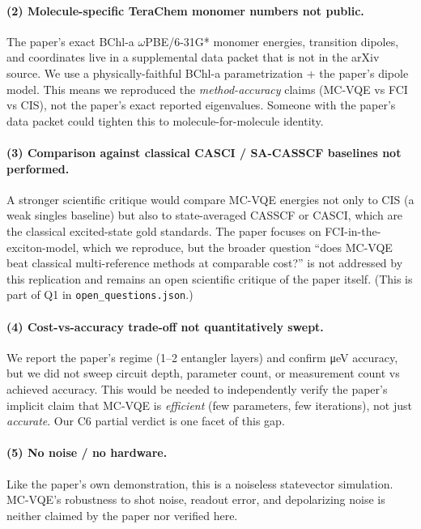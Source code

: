 \documentclass[11pt]{article}
\begin{document}
\paragraph{(2) Molecule-specific TeraChem monomer numbers not public.}
The paper's exact BChl-a $\omega$PBE/6-31G* monomer energies, transition
dipoles, and coordinates live in a supplemental data packet that is not in the
arXiv source. We use a physically-faithful BChl-a parametrization + the
paper's dipole model. This means we reproduced the \emph{method-accuracy}
claims (MC-VQE vs FCI vs CIS), not the paper's exact reported eigenvalues.
Someone with the paper's data packet could tighten this to
molecule-for-molecule identity.

\paragraph{(3) Comparison against classical CASCI / SA-CASSCF baselines not
performed.} A stronger scientific critique would compare MC-VQE energies not
only to CIS (a weak singles baseline) but also to state-averaged CASSCF or
CASCI, which are the classical excited-state gold standards. The paper focuses
on FCI-in-the-exciton-model, which we reproduce, but the broader question
``does MC-VQE beat classical multi-reference methods at comparable cost?'' is
not addressed by this replication and remains an open scientific critique of
the paper itself. (This is part of Q1 in \texttt{open\_questions.json}.)

\paragraph{(4) Cost-vs-accuracy trade-off not quantitatively swept.}
We report the paper's regime (1--2 entangler layers) and confirm
\si{\micro\electronvolt} accuracy, but we did not sweep circuit depth,
parameter count, or measurement count vs achieved accuracy. This would be
needed to independently verify the paper's implicit claim that MC-VQE is
\emph{efficient} (few parameters, few iterations), not just \emph{accurate}.
Our C6 partial verdict is one facet of this gap.

\paragraph{(5) No noise / no hardware.} Like the paper's own demonstration,
this is a noiseless statevector simulation. MC-VQE's robustness to shot noise,
readout error, and depolarizing noise is neither claimed by the paper nor
verified here.
\end{document}
